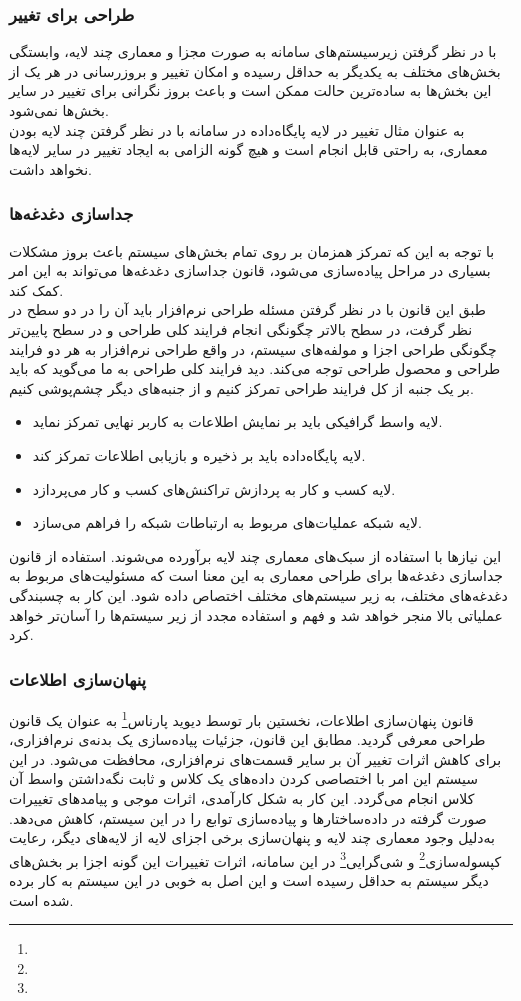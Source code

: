 \documentclass[12pt]{article}
\begin{document}
	\subsubsection{طراحی برای تغییر}
	با در نظر گرفتن زیرسیستم‌های سامانه به صورت مجزا و معماری چند لایه، وابستگی بخش‌های مختلف به یکدیگر به حداقل رسیده و امکان تغییر و بروزرسانی در هر یک از این بخش‌ها به ساده‌ترین حالت ممكن است و باعث بروز نگرانی برای تغییر در سایر بخش‌ها نمی‌شود.\\
	به عنوان مثال تغییر در لایه پایگاه‌داده در سامانه با در نظر گرفتن چند لایه بودن معماری، به راحتی قابل انجام است و هیچ گونه الزامی به ایجاد تغییر در سایر لایه‌ها نخواهد داشت.
	\subsubsection{جداسازی دغدغه‌ها}
	با توجه به این که تمرکز همزمان بر روی تمام بخش‌های سیستم باعث بروز مشکلات بسیاری در مراحل پیاده‌سازی می‌شود، قانون جداسازی ‌دغدغه‌ها می‌تواند به این امر کمک کند.\\
	طبق این قانون با در نظر گرفتن مسئله طراحی نرم‌افزار باید آن را در دو سطح در نظر گرفت، در سطح بالاتر چگونگی انجام فرایند کلی طراحی و در سطح پایین‌تر چگونگی طراحی اجزا و مولفه‌های سیستم، در واقع طراحی نرم‌افزار به هر دو فرایند طراحی و محصول طراحی توجه می‌کند. دید فرایند کلی طراحی به ما می‌گوید که باید بر یک جنبه از کل فرایند طراحی تمرکز کنیم و از جنبه‌های دیگر چشم‌پوشی کنیم.

	\begin{itemize}
		\item
		لایه واسط گرافیکی باید بر نمایش اطلاعات به کاربر نهایی تمرکز نماید.
		\item
		لایه پایگاه‌داده باید بر ذخیره و بازیابی اطلاعات تمرکز کند.
		\item
		لایه کسب و کار به پردازش تراکنش‌های کسب و کار می‌پردازد.
		\item
		لایه شبکه عملیات‌های مربوط به ارتباطات شبکه را فراهم می‌سازد.
	\end{itemize}
	این نیازها با استفاده از سبک‌های معماری چند لایه برآورده می‌شوند. استفاده از قانون جداسازی دغدغه‌ها برای طراحی معماری به این معنا است که مسئولیت‌های مربوط به دغدغه‌های مختلف، به زیر سیستم‌های مختلف اختصاص داده شود. این کار به چسبندگی عملیاتی بالا منجر خواهد شد و فهم و استفاده مجدد از زیر سیستم‌ها را آسان‌تر خواهد کرد.
	\subsubsection{پنهان‌سازی اطلاعات}
	قانون پنهان‌سازی اطلاعات، نخستین بار توسط دیوید پارناس\footnote{} به عنوان یک قانون طراحی معرفی گردید. مطابق این قانون، جزئیات پیاده‌سازی یک بدنه‌ی نرم‌افزاری، برای کاهش اثرات تغییر آن بر سایر قسمت‌های نرم‌افزاری، محافظت می‌شود. در این سیستم این امر با اختصاصی کردن داده‌های یک کلاس و ثابت نگه‌داشتن واسط آن کلاس انجام می‌‌گردد. این کار به شکل کارآمدی، اثرات موجی و پیامدهای تغییرات صورت گرفته در داده‌ساختارها و پیاده‌سازی توابع را در این سیستم، کاهش می‌دهد. به‌دلیل وجود معماری چند لایه و پنهان‌سازی برخی اجزای لایه از لایه‌های دیگر، رعایت کپسوله‌سازی\footnote{} و شی‌گرایی\footnote{} در این سامانه، اثرات تغییرات این گونه اجزا بر بخش‌های دیگر سیستم به حداقل رسیده است و این اصل به خوبی در این سیستم به کار برده شده است.
\end{document}
